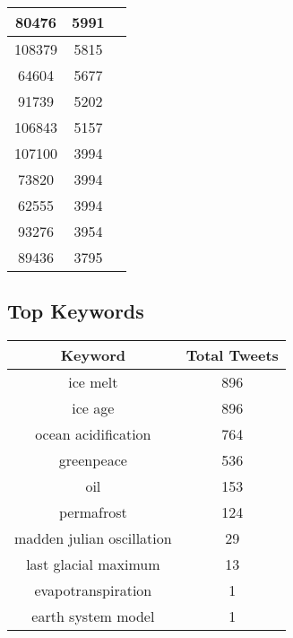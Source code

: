 \documentclass{article}\usepackage[T1]{fontenc}
\begin{document}
\begin{tabular}{|c|c|c|}
 \hline
80476 & 5991\\ 
 \hline
108379 & 5815\\ 
 \hline
64604 & 5677\\ 
 \hline
91739 & 5202\\ 
 \hline
106843 & 5157\\ 
 \hline
107100 & 3994\\ 
 \hline
73820 & 3994\\ 
 \hline
62555 & 3994\\ 
 \hline
93276 & 3954\\ 
 \hline
89436 & 3795\\ 
 \hline
\end{tabular}\subsection*{Top Keywords}\begin{tabular}{|c|c|}         \hline         Keyword & Total Tweets \\ 
 \hline
ice melt & 896\\ 
 \hline
ice age & 896\\ 
 \hline
ocean acidification & 764\\ 
 \hline
greenpeace & 536\\ 
 \hline
oil & 153\\ 
 \hline
permafrost & 124\\ 
 \hline
madden julian oscillation & 29\\ 
 \hline
last glacial maximum & 13\\ 
 \hline
evapotranspiration & 1\\ 
 \hline
earth system model & 1\\ 
 \hline
\end{tabular}
\end{document}
